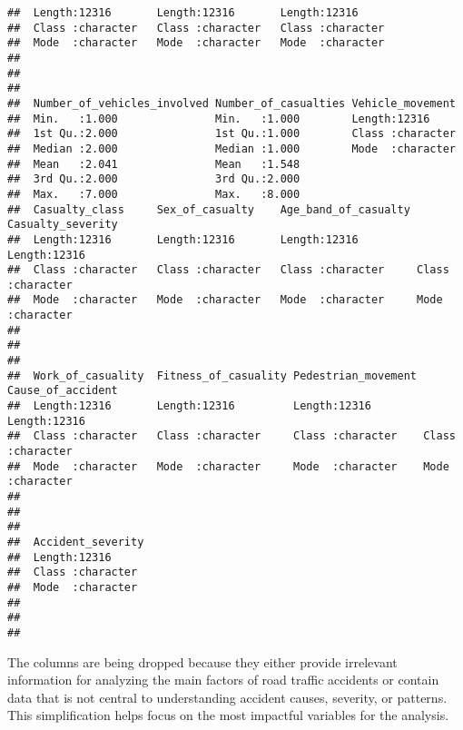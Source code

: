 \documentclass[
]{article}
\begin{document}
\begin{verbatim}
##  Length:12316       Length:12316       Length:12316      
##  Class :character   Class :character   Class :character  
##  Mode  :character   Mode  :character   Mode  :character  
##                                                          
##                                                          
##                                                          
##  Number_of_vehicles_involved Number_of_casualties Vehicle_movement  
##  Min.   :1.000               Min.   :1.000        Length:12316      
##  1st Qu.:2.000               1st Qu.:1.000        Class :character  
##  Median :2.000               Median :1.000        Mode  :character  
##  Mean   :2.041               Mean   :1.548                          
##  3rd Qu.:2.000               3rd Qu.:2.000                          
##  Max.   :7.000               Max.   :8.000                          
##  Casualty_class     Sex_of_casualty    Age_band_of_casualty Casualty_severity 
##  Length:12316       Length:12316       Length:12316         Length:12316      
##  Class :character   Class :character   Class :character     Class :character  
##  Mode  :character   Mode  :character   Mode  :character     Mode  :character  
##                                                                               
##                                                                               
##                                                                               
##  Work_of_casuality  Fitness_of_casuality Pedestrian_movement Cause_of_accident 
##  Length:12316       Length:12316         Length:12316        Length:12316      
##  Class :character   Class :character     Class :character    Class :character  
##  Mode  :character   Mode  :character     Mode  :character    Mode  :character  
##                                                                                
##                                                                                
##                                                                                
##  Accident_severity 
##  Length:12316      
##  Class :character  
##  Mode  :character  
##                    
##                    
## 
\end{verbatim}

The columns are being dropped because they either provide irrelevant
information for analyzing the main factors of road traffic accidents or
contain data that is not central to understanding accident causes,
severity, or patterns. This simplification helps focus on the most
impactful variables for the analysis.
\end{document}
